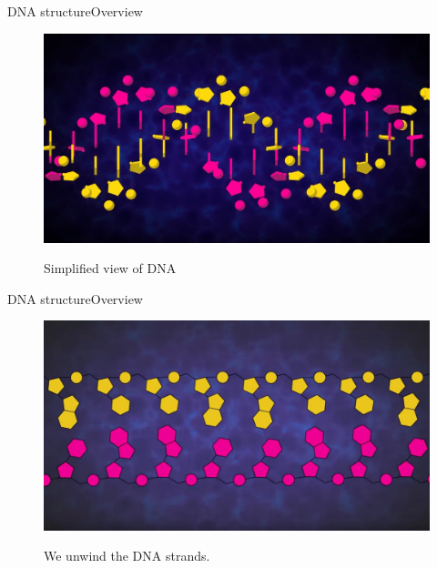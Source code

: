 \documentclass[10pt]{beamer}
\begin{document}
{%
\begin{frame}{DNA structure}{Overview}
	\begin{figure}[]
		\centering
		\includegraphics[width=\textwidth,height=0.7\textheight,keepaspectratio]{img/introduction/dna4.jpg}
		\label{img:mot2}
		\caption{Simplified view of DNA}
	\end{figure}
\end{frame}

\begin{frame}{DNA structure}{Overview}
	\begin{figure}[]
		\centering
		\includegraphics[width=\textwidth,height=0.7\textheight,keepaspectratio]{img/introduction/dna5.jpg}
		\label{img:mot2}
		\caption{We unwind the DNA strands.}
	\end{figure}
\end{frame}

}
\end{document}
